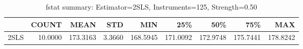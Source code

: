 \begin{table}[ht]
\centering
\caption{fstat summary: Estimator=2SLS, Instruments=125, Strength=0.50}
\begin{tabular}{lrrrrrrrr}
\toprule
 & COUNT & MEAN & STD & MIN & 25\% & 50\% & 75\% & MAX \\
\midrule
2SLS & 10.0000 & 173.3163 & 3.3660 & 168.5945 & 171.0092 & 172.9748 & 175.7441 & 178.8242 \\
\bottomrule
\end{tabular}
\end{table}
